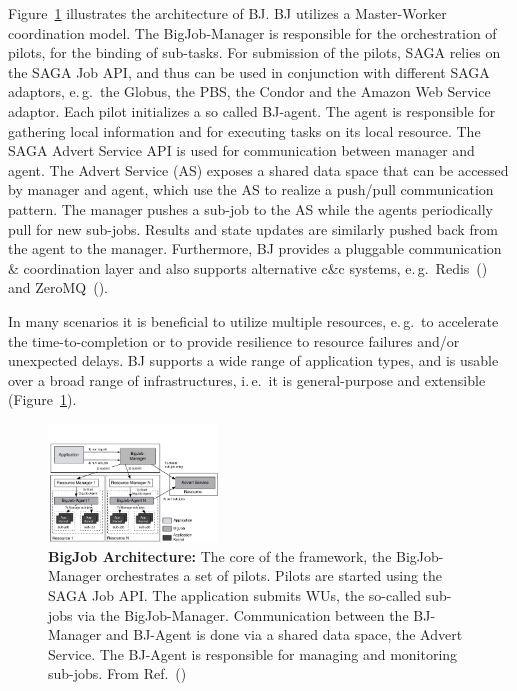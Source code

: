 \documentclass{sig-alternate}
\begin{document}
Figure~\ref{fig:figures_re_bigjob_interactions} illustrates the
architecture of BJ. BJ utilizes a Master-Worker coordination
model. The BigJob-Manager is responsible for the orchestration of
pilots, for the binding of sub-tasks. For submission of the pilots,
SAGA relies on the SAGA Job API, and thus can be used in conjunction
with different SAGA adaptors, e.\,g.\ the Globus, the PBS, the Condor
and the Amazon Web Service adaptor. Each pilot initializes a so called
BJ-agent. The agent is responsible for gathering local information and
for executing tasks on its local resource. The SAGA Advert Service API
is used for communication between manager and agent. The Advert
Service (AS) exposes a shared data space that can be accessed by
manager and agent, which use the AS to realize a push/pull
communication pattern.  The manager pushes a sub-job to the AS while
the agents periodically pull for new sub-jobs. Results and state
updates are similarly pushed back from the agent to the
manager. Furthermore, BJ provides a pluggable communication \&
coordination layer and also supports alternative c\&c systems,
e.\,g.\ Redis~(\cite{redis}) and ZeroMQ~(\cite{zmq}).

In many scenarios it is beneficial to utilize multiple resources,
e.\,g.\ to accelerate the time-to-completion or to provide resilience
to resource failures and/or unexpected delays.  BJ supports a wide
range of application types, and is usable over a broad range of
infrastructures, i.\,e.\ it is general-purpose and extensible
(Figure~\ref{fig:figures_re_bigjob_interactions}). 


\begin{figure}[t]
  \centering
  \includegraphics[width=0.40\textwidth]{./figs/re_bigjob_interactions}
   \caption{\textbf{BigJob Architecture:} The core of the framework,
     the BigJob-Manager orchestrates a set of pilots. Pilots are
     started using the SAGA Job API. The application submits WUs, the
     so-called sub-jobs via the BigJob-Manager. Communication between
     the BJ-Manager and BJ-Agent is done via a shared data space, the
     Advert Service. The BJ-Agent is responsible for managing and
     monitoring sub-jobs. From Ref.~(\cite{saga_bigjob_condor_cloud})}
        \label{fig:figures_re_bigjob_interactions}
\end{figure}
\end{document}
